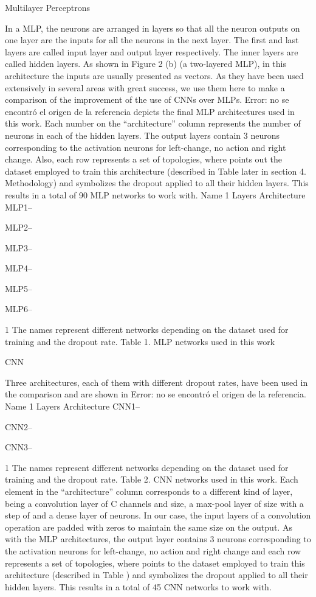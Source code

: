 Multilayer Perceptrons

In a MLP, the neurons are arranged in layers so that all the neuron outputs on one layer are the inputs for all the neurons in the next layer. The first and last layers are called input layer and output layer respectively. The inner layers are called hidden layers. As shown in Figure 2 (b) (a two-layered MLP), in this architecture the inputs are usually presented as vectors.
As they have been used extensively in several areas with great success, we use them here to make a comparison of the improvement of the use of CNNs over MLPs.
Error: no se encontró el origen de la referencia depicts the final MLP architectures used in this work. Each number on the “architecture” column represents the number of neurons in each of the hidden layers. The output layers contain 3 neurons corresponding to the activation neurons for left-change, no action and right change. Also, each row represents a set of topologies, where  points out the dataset employed to train this architecture (described in Table  later in section 4. Methodology) and  symbolizes the dropout applied to all their hidden layers. This results in a total of 90 MLP networks to work with.
Name 1
Layers
Architecture
MLP1--


MLP2--


MLP3--


MLP4--


MLP5--


MLP6--


1 The names represent different networks depending on the dataset used for training and the dropout rate.
Table 1. MLP networks used in this work

CNN

Three architectures, each of them with different dropout rates, have been used in the comparison and are shown in Error: no se encontró el origen de la referencia.
Name 1
Layers
Architecture
CNN1--


CNN2--


CNN3--


1 The names represent different networks depending on the dataset used for training and the dropout rate.
Table 2. CNN networks used in this work.
Each element in the “architecture” column corresponds to a different kind of layer, being  a convolution layer of C channels and  size,  a max-pool layer of  size with a step of  and  a dense layer of  neurons. In our case, the input layers of a convolution operation are padded with zeros to maintain the same  size on the output. As with the MLP architectures, the output layer contains 3 neurons corresponding to the activation neurons for left-change, no action and right change and each row represents a set of topologies, where  points to the dataset employed to train this architecture (described in Table ) and  symbolizes the dropout applied to all their hidden layers. This results in a total of 45 CNN networks to work with.



